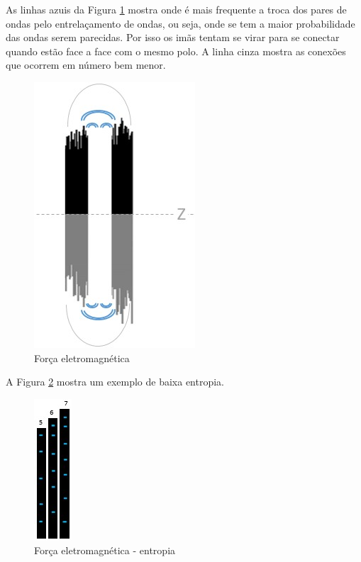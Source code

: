 As linhas azuis da Figura \ref{fig:consciousness_electromaagnetic_force} mostra onde é mais frequente a troca dos pares de ondas pelo entrelaçamento de ondas, ou seja, onde se tem a maior probabilidade das ondas serem parecidas. Por isso os imãs tentam se virar para se conectar quando estão face a face com o mesmo polo. A linha cinza mostra as conexões que ocorrem em número bem menor.
	\begin{figure}[H]
	\caption{Força eletromagnética}
	\label{fig:consciousness_electromaagnetic_force}
	\centering
	\includegraphics[scale=.7]{sections/images/consciousness_electromaagnetic_force.jpg}
	\end{figure}

A Figura \ref{fig:consciousness_electromaagnetic_force_entropy} mostra um exemplo de baixa entropia. 
	\begin{figure}[H]
	\caption{Força eletromagnética - entropia}
	\label{fig:consciousness_electromaagnetic_force_entropy}
	\centering
	\includegraphics[scale=.9]{sections/images/consciousness_electromaagnetic_force_entropy.jpg}
	\end{figure}

